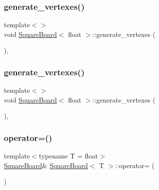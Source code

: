 \mbox{\label{classSquareBoard_a7928f781c7709b3fdfe42b5ce5bfc3f9}} 
\subsubsection{\texorpdfstring{generate\+\_\+vertexes()}{generate\_vertexes()}\hspace{0.1cm}{\footnotesize\ttfamily [3/4]}}
{\footnotesize\ttfamily template$<$$>$ \\
void \mbox{\hyperlink{classSquareBoard}{Square\+Board}}$<$ float $>$\+::generate\+\_\+vertexes (\begin{DoxyParamCaption}{ }\end{DoxyParamCaption})\hspace{0.3cm}{\ttfamily [inline]}, {\ttfamily [private]}}

\mbox{\label{classSquareBoard_a7928f781c7709b3fdfe42b5ce5bfc3f9}} 
\subsubsection{\texorpdfstring{generate\+\_\+vertexes()}{generate\_vertexes()}\hspace{0.1cm}{\footnotesize\ttfamily [4/4]}}
{\footnotesize\ttfamily template$<$$>$ \\
void \mbox{\hyperlink{classSquareBoard}{Square\+Board}}$<$ float $>$\+::generate\+\_\+vertexes (\begin{DoxyParamCaption}{ }\end{DoxyParamCaption})\hspace{0.3cm}{\ttfamily [inline]}, {\ttfamily [private]}}

\mbox{\label{classSquareBoard_a354794a6de9edec8c771ca49dd315acf}} 
\subsubsection{\texorpdfstring{operator=()}{operator=()}\hspace{0.1cm}{\footnotesize\ttfamily [1/4]}}
{\footnotesize\ttfamily template$<$typename T  = float$>$ \\
\mbox{\hyperlink{classSquareBoard}{Square\+Board}}\& \mbox{\hyperlink{classSquareBoard}{Square\+Board}}$<$ T $>$\+::operator= (\begin{DoxyParamCaption}\item[{\mbox{\hyperlink{classSquareBoard}{Square\+Board}}$<$ T $>$ \&\&}]{ }\end{DoxyParamCaption})\hspace{0.3cm}{\ttfamily [default]}}

